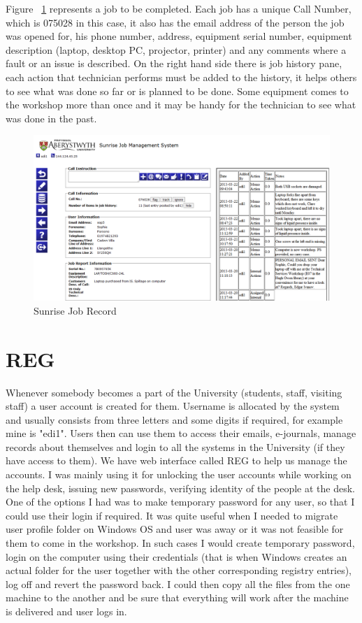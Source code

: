 \documentclass[10pt,a4paper,headinclude=true,twoside]{report}
\begin{document}
Figure ~\ref{fig:sunrise_job} represents a job to be completed. Each job has a unique Call Number, which is 075028 in this case, it also has the email address of the person the job was opened for, his phone number, address, equipment serial number, equipment description (laptop, desktop PC, projector, printer) and any comments where a fault or an issue is described. On the right hand side there is job history pane, each action that technician performs must be added to the history, it helps others to see what was done so far or is planned to be done. Some equipment comes to the workshop more than once and it may be handy for the technician to see what was done in the past.

\begin{figure}[H]
\centering
\centerline{\includegraphics[scale=0.5]{./sunrise_job}}
\caption{Sunrise Job Record}
\label{fig:sunrise_job}
\end{figure}

\section{REG}
Whenever somebody becomes a part of the University (students, staff, visiting staff) a user account is created for them. Username is allocated by the system and usually consists from three letters and some digits if required, for example mine is "edi1". Users then can use them to access their emails, e-journals, manage records about themselves and login to all the systems in the University (if they have access to them). We have web interface called REG to help us manage the accounts. I was mainly using it for unlocking the user accounts while working on the help desk, issuing new passwords, verifying identity of the people at the desk. One of the options I had was to make temporary password for any user, so that I could use their login if required. It was quite useful when I needed to migrate user profile folder on Windows OS and user was away or it was not feasible for them to come in the workshop. In such cases I would create temporary password, login on the computer using their credentials (that is when Windows creates an actual folder for the user together with the other corresponding registry entries), log off and revert the password back. I could then copy all the files from the one machine to the another and be sure that everything will work after the machine is delivered and user logs in.
\end{document}
